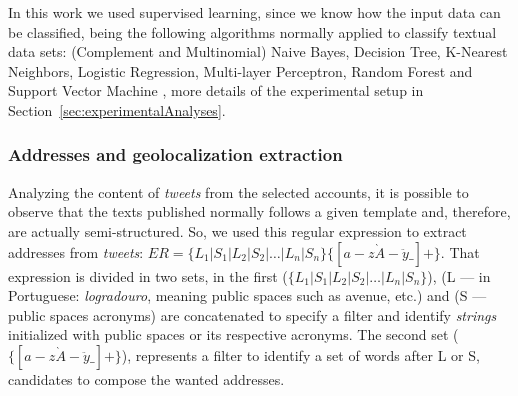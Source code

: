 \documentclass[runningheads]{llncs}
\begin{document}

In this work we used supervised learning, since we know how the input data can be classified, being the following algorithms normally applied to classify textual data sets: (Complement and Multinomial) Naive Bayes, Decision Tree, K-Nearest Neighbors, Logistic Regression, Multi-layer Perceptron, Random Forest and Support Vector Machine \cite{kotsiantis2007supervised, dwivedi2016automatic, narayanan2017survey}, more details of the experimental setup in Section~\ref{sec:experimentalAnalyses}.
%

\subsubsection{Addresses and geolocalization extraction}

Analyzing the content of \textit{tweets} from the selected accounts, it is possible to observe that the texts published normally follows a given template and, therefore, are actually semi-structured. So, we used this regular expression to extract addresses from \textit{tweets}: $ER = \lbrace L_1 | S_1 | L_2 | S_2 | \dots | L_n | S_n \rbrace \lbrace [a-z\grave{A}-\ddot{y}\_] + \rbrace$.
That expression is divided in two sets, in the first ($\lbrace L_1 | S_1 | L_2 | S_2 | \dots | L_n | S_n \rbrace $), (L --- in Portuguese: \textit{logradouro}, meaning public spaces such as avenue, etc.) and (S --- public spaces acronyms) are concatenated to specify a filter and identify \textit{strings} initialized with public spaces or its respective acronyms. The second set ($\lbrace [a-z\grave{A}-\ddot{y}\_] + \rbrace $), represents a filter to identify a set of words after L or S, candidates to compose the wanted addresses.
\end{document}

